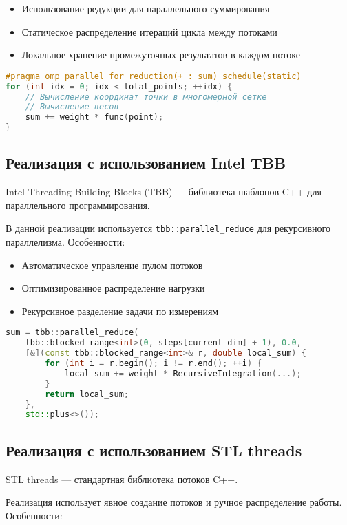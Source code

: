 \documentclass[14pt,a4paper]{extarticle}
\begin{document}
\begin{itemize}
    \item Использование редукции для параллельного суммирования
    \item Статическое распределение итераций цикла между потоками
    \item Локальное хранение промежуточных результатов в каждом потоке
\end{itemize}

\begin{lstlisting}[language=C++]
#pragma omp parallel for reduction(+ : sum) schedule(static)
for (int idx = 0; idx < total_points; ++idx) {
    // Вычисление координат точки в многомерной сетке
    // Вычисление весов
    sum += weight * func(point);
}
\end{lstlisting}

\subsection{Реализация с использованием Intel TBB}
Intel Threading Building Blocks (TBB) — библиотека шаблонов C++ для параллельного программирования.

В данной реализации используется \texttt{tbb::parallel\_reduce} для рекурсивного параллелизма. Особенности:

\begin{itemize}
    \item Автоматическое управление пулом потоков
    \item Оптимизированное распределение нагрузки
    \item Рекурсивное разделение задачи по измерениям
\end{itemize}

\begin{lstlisting}[language=C++]
sum = tbb::parallel_reduce(
    tbb::blocked_range<int>(0, steps[current_dim] + 1), 0.0,
    [&](const tbb::blocked_range<int>& r, double local_sum) {
        for (int i = r.begin(); i != r.end(); ++i) {
            local_sum += weight * RecursiveIntegration(...);
        }
        return local_sum;
    },
    std::plus<>());
\end{lstlisting}

\subsection{Реализация с использованием STL threads}
STL threads — стандартная библиотека потоков C++.

Реализация использует явное создание потоков и ручное распределение работы. Особенности:
\end{document}
